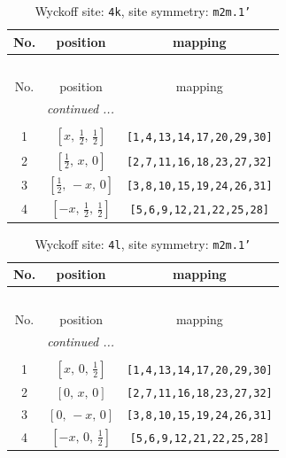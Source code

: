\documentclass[fleqn,8pt]{jsarticle}
\begin{document}
\renewcommand{\arraystretch}{1.2}
\begin{longtable}{ccc}
\caption{Wyckoff site: {\tt 4k}, site symmetry: {\tt m2m.1'}}
 \\
 \hline \hline
No. & position & mapping \\ \hline \endfirsthead

\multicolumn{2}{l}{\tablename\ \thetable{}} \\
 \hline \hline
No. & position & mapping \\ \hline \endhead

 \hline \hline
\multicolumn{2}{r}{\footnotesize\it continued ...} \\ \endfoot

 \hline \hline
\multicolumn{2}{r}{} \\ \endlastfoot

1 & $\left[ x,\, \frac{1}{2},\, \frac{1}{2} \right]$ & {\tt [1,4,13,14,17,20,29,30]} \\ \hline
2 & $\left[ \frac{1}{2},\, x,\, 0 \right]$ & {\tt [2,7,11,16,18,23,27,32]} \\ \hline
3 & $\left[ \frac{1}{2},\, - x,\, 0 \right]$ & {\tt [3,8,10,15,19,24,26,31]} \\ \hline
4 & $\left[ - x,\, \frac{1}{2},\, \frac{1}{2} \right]$ & {\tt [5,6,9,12,21,22,25,28]} \\
\end{longtable}
\renewcommand{\arraystretch}{1.2}
\begin{longtable}{ccc}
\caption{Wyckoff site: {\tt 4l}, site symmetry: {\tt m2m.1'}}
 \\
 \hline \hline
No. & position & mapping \\ \hline \endfirsthead

\multicolumn{2}{l}{\tablename\ \thetable{}} \\
 \hline \hline
No. & position & mapping \\ \hline \endhead

 \hline \hline
\multicolumn{2}{r}{\footnotesize\it continued ...} \\ \endfoot

 \hline \hline
\multicolumn{2}{r}{} \\ \endlastfoot

1 & $\left[ x,\, 0,\, \frac{1}{2} \right]$ & {\tt [1,4,13,14,17,20,29,30]} \\ \hline
2 & $\left[ 0,\, x,\, 0 \right]$ & {\tt [2,7,11,16,18,23,27,32]} \\ \hline
3 & $\left[ 0,\, - x,\, 0 \right]$ & {\tt [3,8,10,15,19,24,26,31]} \\ \hline
4 & $\left[ - x,\, 0,\, \frac{1}{2} \right]$ & {\tt [5,6,9,12,21,22,25,28]} \\
\end{longtable}
\end{document}
